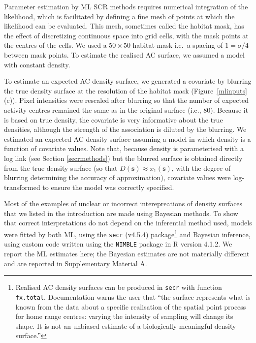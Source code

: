 \documentclass[useAMS,usenatbib,referee]{biom}
\begin{document}
Parameter estimation by ML SCR methods requires numerical integration of the likelihood, which is facilitated by defining a fine mesh of points at which the likelihood can be evaluated. This mesh, sometimes called the habitat mask, has the effect of discretizing continuous space into grid cells, with the mask points at the centres of the cells. We used a $50\times 50$ habitat mask i.e.\, a spacing of $1=\sigma/4$ between mask points. To estimate the realised AC surface, we assumed a model with constant density. 

To estimate an expected AC density surface, we generated a covariate by blurring the true density surface at the resolution of the habitat mask (Figure~\ref{mlinputs}(c)). Pixel intensities were rescaled after blurring so that the number of expected activity centres remained the same as in the original surface (i.e., 80). Because it is based on true density, the covariate is very informative about the true densities, although the strength of the association is diluted by the blurring. We estimated an expected AC density surface assuming a model in which density is a function of covariate values. Note that, because density is parameterised with a log link (see Section \ref{secrmethods}) but the blurred surface is obtained directly from the true density surface (so that $D(\mathbf{s})\approx x_1(\mathbf{s})$, with the degree of blurring determining the accuracy of approximation), covariate values were log-transformed to ensure the model was correctly specified.%

Most of the examples of unclear or incorrect interepreations of density surfaces that we listed in the introduction are made using Bayesian methods. To show that correct interpretations do not depend on the inferential method used, models were fitted by both ML, using the \texttt{secr} (v4.5.4) package\footnote{Realised AC density surfaces can be produced in \texttt{secr} with function \texttt{fx.total}. Documentation warns the user that ``the surface represents what is known from the data about a specific realisation of the spatial point process for home range centres: varying the intensity of sampling will change its shape. It is not an unbiased estimate of a biologically meaningful density surface.''} \citep{secr:21} and Bayesian inference, using custom code written using the \texttt{NIMBLE} package \citep{deValpine:17, Turek:21} in R version 4.1.2. We report the ML estimates here; the Bayesian estimates are not materially different and are reported in Supplementary Material A.
\end{document}
